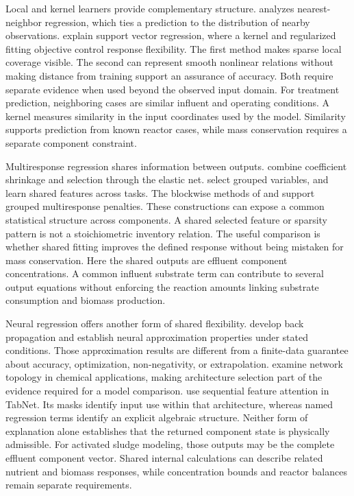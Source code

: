 Local and kernel learners provide complementary structure. \citet{Mack1981} analyzes nearest-neighbor regression, which ties a prediction to the distribution of nearby observations. \citet{SmolaScholkopf2004} explain support vector regression, where a kernel and regularized fitting objective control response flexibility. The first method makes sparse local coverage visible. The second can represent smooth nonlinear relations without making distance from training support an assurance of accuracy. Both require separate evidence when used beyond the observed input domain. For treatment prediction, neighboring cases are similar influent and operating conditions. A kernel measures similarity in the input coordinates used by the model. Similarity supports prediction from known reactor cases, while mass conservation requires a separate component constraint.

Multiresponse regression shares information between outputs. \citet{Zou2005} combine coefficient shrinkage and selection through the elastic net. \citet{Yuan2006} select grouped variables, and \citet{Argyriou2008} learn shared features across tasks. The blockwise methods of \citet{Liu2009} and \citet{Simon2013} support grouped multiresponse penalties. These constructions can expose a common statistical structure across components. A shared selected feature or sparsity pattern is not a stoichiometric inventory relation. The useful comparison is whether shared fitting improves the defined response without being mistaken for mass conservation. Here the shared outputs are effluent component concentrations. A common influent substrate term can contribute to several output equations without enforcing the reaction amounts linking substrate consumption and biomass production.

Neural regression offers another form of shared flexibility. \citet{Rumelhart1986} develop back propagation and \citet{Hornik1989} establish neural approximation properties under stated conditions. Those approximation results are different from a finite-data guarantee about accuracy, optimization, non-negativity, or extrapolation. \citet{Curteanu2011} examine network topology in chemical applications, making architecture selection part of the evidence required for a model comparison. \citet{ArikPfister2021} use sequential feature attention in TabNet. Its masks identify input use within that architecture, whereas named regression terms identify an explicit algebraic structure. Neither form of explanation alone establishes that the returned component state is physically admissible. For activated sludge modeling, those outputs may be the complete effluent component vector. Shared internal calculations can describe related nutrient and biomass responses, while concentration bounds and reactor balances remain separate requirements.

